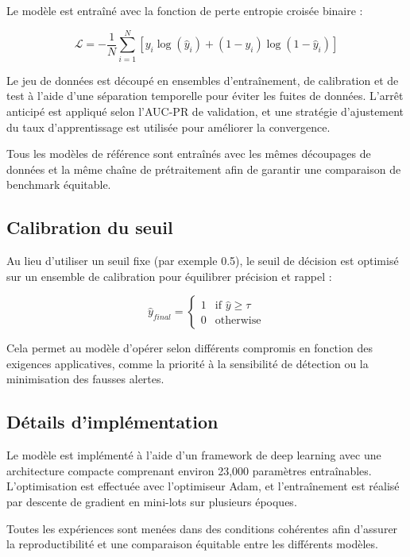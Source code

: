 Le modèle est entraîné avec la fonction de perte entropie croisée binaire :

\begin{equation}
\mathcal{L} = - \frac{1}{N} \sum_{i=1}^{N} \left[
y_i \log(\hat{y}_i) + (1 - y_i)\log(1 - \hat{y}_i)
\right]
\end{equation}

Le jeu de données est découpé en ensembles d'entraînement, de calibration et de
test à l'aide d'une séparation temporelle pour éviter les fuites de données.
L'arrêt anticipé est appliqué selon l'AUC-PR de validation, et une stratégie
d'ajustement du taux d'apprentissage est utilisée pour améliorer la convergence.

Tous les modèles de référence sont entraînés avec les mêmes découpages de données
et la même chaîne de prétraitement afin de garantir une comparaison de benchmark
équitable.

\subsection{Calibration du seuil}

Au lieu d'utiliser un seuil fixe (par exemple 0.5), le seuil de décision est
optimisé sur un ensemble de calibration pour équilibrer précision et rappel :

\begin{equation}
\hat{y}_{final} =
\begin{cases}
1 & \text{if } \hat{y} \geq \tau \\
0 & \text{otherwise}
\end{cases}
\end{equation}

Cela permet au modèle d'opérer selon différents compromis en fonction des
exigences applicatives, comme la priorité à la sensibilité de détection ou la
minimisation des fausses alertes.

\subsection{Détails d'implémentation}

Le modèle est implémenté à l'aide d'un framework de deep learning avec une
architecture compacte comprenant environ 23{,}000 paramètres entraînables.
L'optimisation est effectuée avec l'optimiseur Adam, et l'entraînement est
réalisé par descente de gradient en mini-lots sur plusieurs époques.

Toutes les expériences sont menées dans des conditions cohérentes afin d'assurer
la reproductibilité et une comparaison équitable entre les différents modèles.